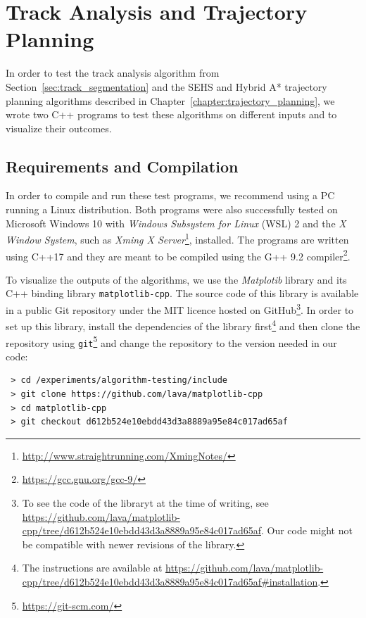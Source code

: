 \section{Track Analysis and Trajectory Planning}

In order to test the track analysis algorithm from Section~\ref{sec:track_segmentation} and the \gls{SEHS} and Hybrid A* trajectory planning algorithms described in Chapter~\ref{chapter:trajectory_planning}, we wrote two C++ programs to test these algorithms on different inputs and to visualize their outcomes.

\subsection{Requirements and Compilation}

In order to compile and run these test programs, we recommend using a PC running a Linux distribution. Both programs were also successfully tested on Microsoft Windows 10 with \textit{Windows Subsystem for Linux} (WSL) 2 and the \textit{X Window System}, such as \textit{Xming X Server}\footnote{\url{http://www.straightrunning.com/XmingNotes/}}, installed. The programs are written using C++17 and they are meant to be compiled using the G++ 9.2 compiler\footnote{\url{https://gcc.gnu.org/gcc-9/}}.

To visualize the outputs of the algorithms, we use the \textit{Matplotib} library and its C++ binding library \texttt{matplotlib-cpp}. The source code of this library is available in a public Git repository under the MIT licence hosted on GitHub\footnote{To see the code of the libraryt at the time of writing, see \url{https://github.com/lava/matplotlib-cpp/tree/d612b524e10ebdd43d3a8889a95e84c017ad65af}. Our code might not be compatible with newer revisions of the library.}. In order to set up this library, install the dependencies of the library first\footnote{The instructions are available at \url{https://github.com/lava/matplotlib-cpp/tree/d612b524e10ebdd43d3a8889a95e84c017ad65af#installation}.} and then clone the repository using \texttt{git}\footnote{\url{https://git-scm.com/}} and change the repository to the version needed in our code:

\begin{verbatim}
 > cd /experiments/algorithm-testing/include
 > git clone https://github.com/lava/matplotlib-cpp
 > cd matplotlib-cpp
 > git checkout d612b524e10ebdd43d3a8889a95e84c017ad65af
\end{verbatim}

